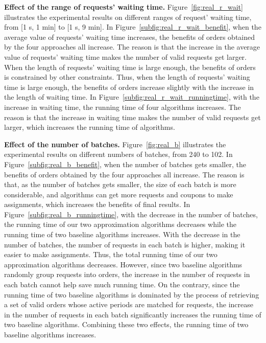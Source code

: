 \textbf{Effect of the range of requests' waiting time.} Figure~\ref{fig:real_r_wait} illustrates the experimental results on different ranges of request' waiting time, from [1 s, 1 min] to [1 s, 9 min]. In Figure~\ref{subfig:real_r_wait_benefit}, when the average value of requests' waiting time increases, the benefits of orders obtained by the four approaches all increase. The reason is that the increase in the average value of requests' waiting time makes the number of valid requests get larger. When the length of requests' waiting time is large enough, the benefits of orders is constrained by other constraints. Thus, when the length of requests' waiting time is large enough, the benefits of orders increase slightly with the increase in the length of waiting time. In Figure~\ref{subfig:real_r_wait_runningtime}, with the increase in waiting time, the running time of four algorithms increases. The reason is that the increase in waiting time makes the number of valid requests get larger, which increases the running time of algorithms. 

\textbf{Effect of the number of batches.} Figure~\ref{fig:real_b} illustrates the experimental results on different numbers of batches, from 240 to 102. In Figure~\ref{subfig:real_b_benefit}, when the number of batches gets smaller, the benefits of orders obtained by the four approaches all increase. The reason is that, as the number of batches gets smaller, the size of each batch is more considerable, and algorithms can get more requests and coupons to make assignments, which increases the benefits of final results. In Figure~\ref{subfig:real_b_runningtime}, with the decrease in the number of batches, the running time of our two approximation algorithms decreases while the running time of two baseline algorithms increases. With the decrease in the number of batches, the number of requests in each batch is higher, making it easier to make assignments. Thus, the total running time of our two approximation algorithms decreases. However, since two baseline algorithms randomly group requests into orders, the increase in the number of requests in each batch cannot help save much running time. On the contrary,  since the running time of two baseline algorithms is dominated by the process of retrieving a set of valid orders whose active periods are matched for requests, the increase in the number of requests in each batch significantly increases the running time of two baseline algorithms. Combining these two effects, the running time of two baseline algorithms increases.

